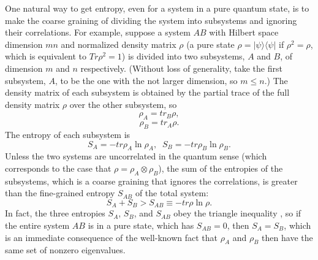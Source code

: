 \documentclass[12pt]{article}
\begin{document}
     One natural way to get entropy, even for a system in a pure
quantum state,
is to make the coarse graining of dividing the system into subsystems
and
ignoring their correlations.  For example, suppose a system $AB$ with
Hilbert
space dimension $mn$ and normalized density matrix $\rho$ (a pure
state $\rho =
|\psi\rangle\langle\psi|$ if $\rho^2 = \rho$, which is equivalent to
$Tr \rho^2
= 1$) is divided into two subsystems, $A$ and $B$, of dimension $m$
and $n$
respectively.  (Without loss of generality, take the first subsystem,
$A$, to
be the one with the not larger dimension, so $m\leq n$.)  The density
matrix of
each subsystem is obtained by the partial trace of the full density
matrix
$\rho$ over the other subsystem, so
	\begin{equation}
        \rho_{A}={tr}_B\rho,
	\end{equation}
	\begin{equation}
	\rho_{B}={tr}_A\rho.
	\end{equation}
The entropy of each subsystem is
	\begin{equation}
	S_A=-tr\rho_A \ln \rho_A,\;\;S_B=-tr\rho_B \ln \rho_B.
	\end{equation}
Unless the two systems are uncorrelated in the quantum sense (which
corresponds
to the case that $\rho=\rho_A\otimes \rho_B$), the sum of the
entropies of the
subsystems, which is a coarse graining that ignores the correlations,
is
greater than the fine-grained entropy $S_{AB}$ of the total system:
	\begin{equation}
	S_A+S_B > S_{AB} \equiv -tr\rho \ln \rho.
	\end{equation}
In fact, the three entropies $S_A$, $S_B$, and $S_{AB}$ obey the
triangle
inequality \cite{A}, so if the entire system $AB$ is in a pure state,
which has
$S_{AB}=0$, then $S_A=S_B$, which is an immediate consequence of the
well-known
fact that $\rho_A$ and $\rho_B$ then have the same set of nonzero
eigenvalues.
\end{document}
